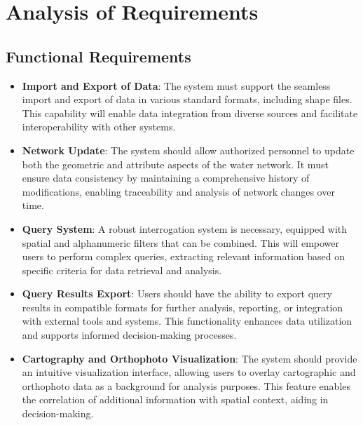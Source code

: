 \section{Analysis of Requirements}
\label{sec:requirements}

\subsection{Functional Requirements}
\begin{itemize}
    \item \textbf{Import and Export of Data}: The system must support the seamless import and export of data in various standard formats, including shape files. This capability will enable data integration from diverse sources and facilitate interoperability with other systems.
    \item \textbf{Network Update}: The system should allow authorized personnel to update both the geometric and attribute aspects of the water network. It must ensure data consistency by maintaining a comprehensive history of modifications, enabling traceability and analysis of network changes over time.
    \item \textbf{Query System}: A robust interrogation system is necessary, equipped with spatial and alphanumeric filters that can be combined. This will empower users to perform complex queries, extracting relevant information based on specific criteria for data retrieval and analysis.
    \item \textbf{Query Results Export}: Users should have the ability to export query results in compatible formats for further analysis, reporting, or integration with external tools and systems. This functionality enhances data utilization and supports informed decision-making processes.
    \item \textbf{Cartography and Orthophoto Visualization}: The system should provide an intuitive visualization interface, allowing users to overlay cartographic and orthophoto data as a background for analysis purposes. This feature enables the correlation of additional information with spatial context, aiding in decision-making.
\end{itemize}

